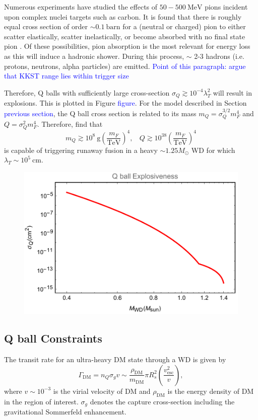 \documentclass[twocolumn,showpacs,preprintnumbers,amsmath,amssymb,prl]{revtex4}
\def\r{\right)}
\def\l{\left(}
\begin{document}
Numerous experiments have studied the effects of $50 - 500 ~\text{MeV}$ pions incident upon complex nuclei targets such as carbon. It is found that there is roughly equal cross section of order $\sim 0.1 ~\text{barn}$ for a (neutral or charged) pion to either scatter elastically, scatter inelastically, or become absorbed with no final state pion \cite{Pionnuclear}. Of these possibilities, pion absorption is the most relevant for energy loss as this will induce a hadronic shower. During this process, $\sim$ 2-3 hadrons (i.e. protons, neutrons, alpha particles) are emitted. \textcolor{blue}{Point of this paragraph: argue that KKST range lies within trigger size}

Therefore, Q balls with sufficiently large cross-section $\sigma_Q \gtrsim 10^{-4} \lambda_T^2$ will result in explosions. This is plotted in Figure \textcolor{blue}{figure}. For the model described in Section \textcolor{blue}{previous section}, the Q ball cross section is related to its mass $m_Q = \sigma_Q^{3/2} m_F^4$ and $Q = \sigma_Q^2 m_F^4$. Therefore, find that
\begin{equation}
m_Q \gtrsim 10^8 ~\text{g} \l\frac{m_F}{\text{TeV}}\r^4, ~~~~ Q \gtrsim 10^{38} \l\frac{m_F}{\text{TeV}}\r^4
\end{equation}
is capable of triggering runaway fusion in a heavy $\sim 1.25 M_{\odot}$ WD for which $\lambda_T \sim 10^5 ~\text{cm}$.

\begin{figure}
\includegraphics[scale=.45]{boomQball.pdf}
\end{figure}


\subsection{Q ball Constraints}
The transit rate for an ultra-heavy DM state through a WD is given by
\begin{equation}
\Gamma_\text{DM} = n_Q \sigma_g v \sim \frac{\rho_{\text{DM}}}{m_\text{DM}} \pi R_{s}^2 \l\frac{v_\text{esc}^2}{v}\r,
\end{equation}
where $v \sim 10^{-3}$ is the virial velocity of DM and $\rho_{\text{DM}}$ is the energy density of DM in the region of interest. $\sigma_g$ denotes the capture cross-section including the gravitational Sommerfeld enhancement.
\end{document}
